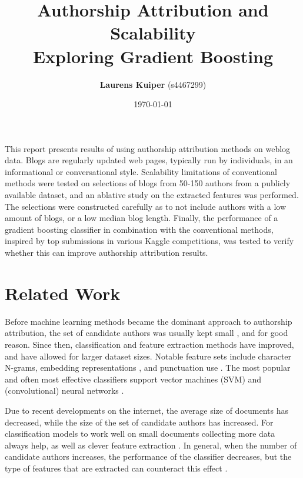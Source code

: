 \documentclass[twocolumn, 12pt]{article}
\title{
	\textbf{Authorship Attribution and Scalability\\
		\large Exploring Gradient Boosting}}
\date{\today}
\author{\textbf{Laurens Kuiper} (s4467299)}
\renewenvironment{abstract}
{\small
	\begin{center}
		\bfseries \abstractname\vspace{-.5em}\vspace{0pt}
	\end{center}
	\list{}{%
		\setlength{\leftmargin}{0.8cm}
		\setlength{\rightmargin}{\leftmargin}
	}%
	\item\relax}
{\endlist}
\begin{document}

\maketitle
\begin{samepage}
\begin{abstract}
	This report presents results of using authorship attribution methods on weblog data.
	Blogs are regularly updated web pages, typically run by individuals, in an informational or conversational style.
	Scalability limitations of conventional methods were tested on selections of blogs from 50-150 authors from a publicly available dataset, and an ablative study on the extracted features was performed.
	The selections were constructed carefully as to not include authors with a low amount of blogs, or a low median blog length.
	Finally, the performance of a gradient boosting classifier in combination with the conventional methods, inspired by top submissions in various Kaggle competitions, was tested to verify whether this can improve authorship attribution results.\vspace{12pt}
\end{abstract}

\end{samepage}
\section{Related Work}
Before machine learning methods became the dominant approach to authorship attribution, the set of candidate authors was usually kept small \cite{word2vec}, and for good reason.
Since then, classification and feature extraction methods have improved, and have allowed for larger dataset sizes.
Notable feature sets include character N-grams, embedding representations \cite{n-gram-vec-nli}, and punctuation use \cite{sockpuppet}.
The most popular and often most effective classifiers support vector machines (SVM) and (convolutional) neural networks \cite{word2vec}\cite{n-gram-aa}.

Due to recent developments on the internet, the average size of documents has decreased, while the size of the set of candidate authors has increased.
For classification models to work well on small documents collecting more data always help, as well as clever feature extraction \cite{micromessage}.
In general, when the number of candidate authors increases, the performance of the classifier decreases, but the type of features that are extracted can counteract this effect \cite{scalability}.
\end{document}
